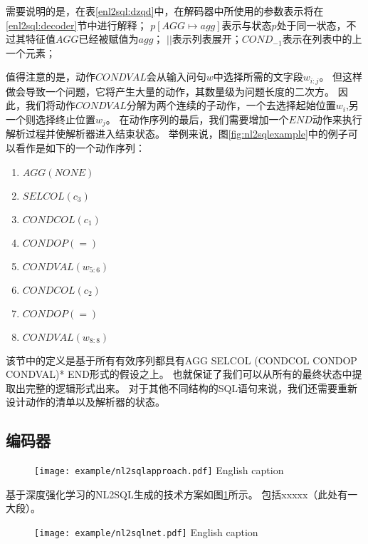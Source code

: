 需要说明的是，在表\ref{enl2sql:dzqd}中，在解码器中所使用的参数表示将在\ref{enl2sql:decoder}节中进行解释；
$p[AGG \mapsto agg]$表示与状态$p$处于同一状态，不过其特征值$AGG$已经被赋值为$agg$；
$||$表示列表展开；$COND_{-1}$表示在列表中的上一个元素；


值得注意的是，动作$CONDVAL$会从输入问句$w$中选择所需的文字段$w_{i:j}$。
但这样做会导致一个问题，它将产生大量的动作，其数量级为问题长度的二次方。
因此，我们将动作$CONDVAL$分解为两个连续的子动作，一个去选择起始位置$w_i$,另一个则选择终止位置$w_j$。
在动作序列的最后，我们需要增加一个$END$动作来执行解析过程并使解析器进入结束状态。
举例来说，图\ref{fig:nl2sqlexample}中的例子可以看作是如下的一个动作序列：
\begin{enumerate}
  \item $AGG(NONE)$
  \item $SELCOL(c_3)$
  \item $CONDCOL(c_1)$
  \item $CONDOP(=)$
  \item $CONDVAL(w_{5:6})$
  \item $CONDCOL(c_2)$
  \item $CONDOP(=)$
  \item $CONDVAL(w_{8:8})$
\end{enumerate}

该节中的定义是基于所有有效序列都具有AGG  SELCOL  (CONDCOL  CONDOP  CONDVAL)* END形式的假设之上。
也就保证了我们可以从所有的最终状态中提取出完整的逻辑形式出来。
对于其他不同结构的SQL语句来说，我们还需要重新设计动作的清单以及解析器的状态。


\subsection{编码器}
\label{enl2sql:encoder}

\begin{figure}[!htp]
  \centering
  \texttt{[image: example/nl2sqlapproach.pdf]}
    {English caption}
  \label{fig:nl2sqlapproach}
\end{figure}

基于深度强化学习的NL2SQL生成的技术方案如图\ref{fig:nl2sqlapproach}所示。
包括xxxxx（此处有一大段）。

\begin{figure}[!htp]
  \centering
  \texttt{[image: example/nl2sqlnet.pdf]}
    {English caption}
  \label{fig:nl2sqlnet}
\end{figure}


